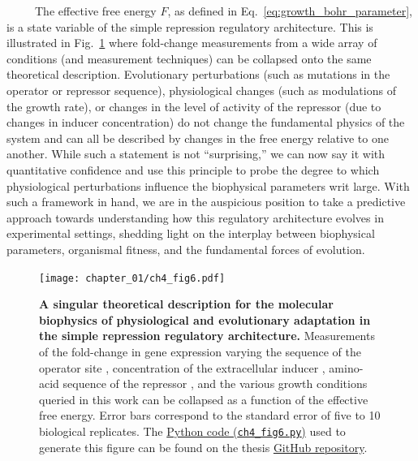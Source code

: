 \documentclass[12pt]{caltech_thesis}
\begin{document}
~~~~~The effective free energy \(F\), as defined in
Eq.~\ref{eq:growth_bohr_parameter}, is a state variable of the simple
repression regulatory architecture. This is illustrated in
Fig.~\ref{fig:collapse} where fold-change measurements from a wide array
of conditions (and measurement techniques) can be collapsed onto the
same theoretical description. Evolutionary perturbations (such as
mutations in the operator or repressor sequence), physiological changes
(such as modulations of the growth rate), or changes in the level of
activity of the repressor (due to changes in inducer concentration) do
not change the fundamental physics of the system and can all be
described by changes in the free energy relative to one another. While
such a statement is not ``surprising,'' we can now say it with
quantitative confidence and use this principle to probe the degree to
which physiological perturbations influence the biophysical parameters
writ large. With such a framework in hand, we are in the auspicious
position to take a predictive approach towards understanding how this
regulatory architecture evolves in experimental settings, shedding light
on the interplay between biophysical parameters, organismal fitness, and
the fundamental forces of evolution.

\hypertarget{fig:collapse}{%
\begin{figure}
\centering
\texttt{[image: chapter\_01/ch4\_fig6.pdf]}
\caption[{A singular theoretical description for the molecular
biophysics of physiological and evolutionary adaptation in the simple
repression motif.}]{\textbf{A singular theoretical description for the
molecular biophysics of physiological and evolutionary adaptation in the
simple repression regulatory architecture.} Measurements of the
fold-change in gene expression varying the sequence of the operator site
\autocite[orange pentagon,][]{garcia2011}, concentration of the
extracellular inducer \autocite[green squares,][ and Chapter
2]{razo-mejia2018}, amino-acid sequence of the repressor \autocite[blue
points,][ and Chapter 3]{chure2019}, and the various growth conditions
queried in this work can be collapsed as a function of the effective
free energy. Error bars correspond to the standard error of five to 10
biological replicates. The
\href{https://github.com/gchure/phd/blob/master/src/chapter_04/code/ch4_fig6.py}{Python
code (\texttt{ch4\_fig6.py})} used to generate this figure can be found
on the thesis \href{https://github.com/gchure/phd}{GitHub repository}.}
\label{fig:collapse}
\end{figure}
}
\end{document}

